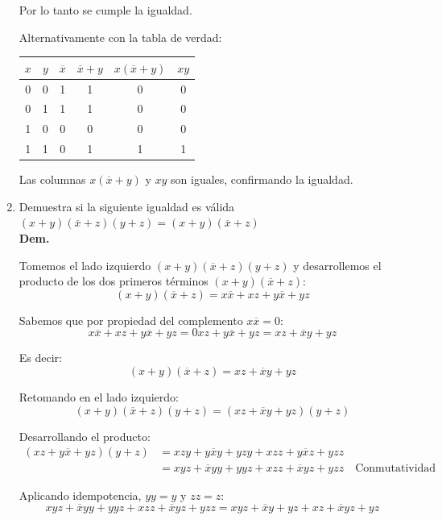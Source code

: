 \documentclass[12pt,letterpaper]{article}
\begin{document}
\begin{enumerate}[label=\arabic*.]
  Por lo tanto se cumple la igualdad.

  Alternativamente con la tabla de verdad:
  \begin{center}
    \begin{tabular}{| c | c | c | c | c | c |}
      \hline
      \textbf{$x$} & \textbf{$y$} & \textbf{$\overline{x}$} & \textbf{$\overline{x} + y$} & \textbf{$x (\overline{x} + y)$} & \textbf{$xy$} \\
      \hline
      0 & 0 & 1 & 1 & 0 & 0 \\
      0 & 1 & 1 & 1 & 0 & 0 \\ 
      1 & 0 & 0 & 0 & 0 & 0 \\
      1 & 1 & 0 & 1 & 1 & 1 \\
      \hline
    \end{tabular}
  \end{center}

  Las columnas $x(\overline{x} + y)$ y $xy$ son iguales, confirmando la igualdad.
  \bigskip
  
\item Demuestra si la siguiente igualdad es válida $(x + y)(\overline{x} + z)(y + z) = (x + y)(\overline{x} + z)$ \\
  \textbf{Dem.}
  
  Tomemos el lado izquierdo $(x + y)(\overline{x} + z)(y + z)$ y desarrollemos el producto de los dos primeros t\'{e}rminos $(x + y)(\overline{x} + z)$:
  \[
  (x + y)(\overline{x} + z) = x\overline{x} + xz + y\overline{x} + yz
  \]

  Sabemos que por propiedad del complemento $x\overline{x} = 0$:
  \[
  x\overline{x} + xz + y\overline{x} + yz = 0 xz + y\overline{x} + yz = xz + \overline{x}y + yz
  \]

  Es decir:
  \[
  (x + y)(\overline{x} + z) = xz + \overline{x}y + yz
  \]
  
  Retomando en el lado izquierdo:
  \[
  (x + y)(\overline{x} + z)(y + z) = (xz + \overline{x}y + yz)(y + z)
  \]

  Desarrollando el producto:
  \begin{align*}
    (xz + y\overline{x} + yz)(y + z) &= xzy + y\overline{x}y + yzy + xzz + y\overline{x}z + yzz \\
    &= xyz + \overline{x}yy + yyz + xzz + \overline{x}yz + yzz \quad \text{Conmutatividad}
  \end{align*}

  Aplicando idempotencia, $yy = y$ y $zz = z$:
  \[
  xyz + \overline{x}yy + yyz + xzz + \overline{x}yz + yzz = xyz + \overline{x}y + yz + xz + \overline{x}yz + yz
  \]


\end{enumerate}
\end{document}
